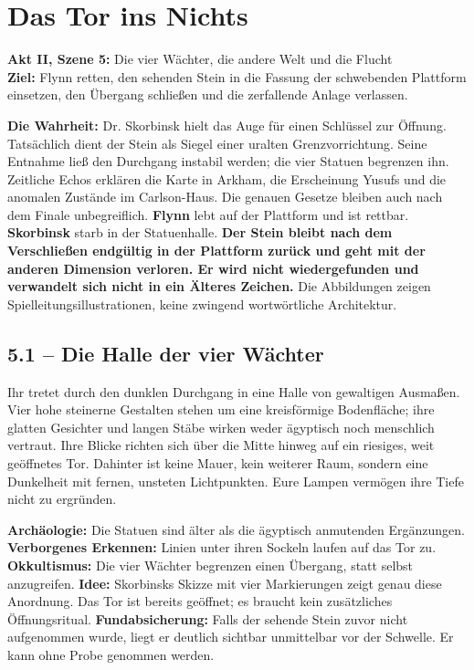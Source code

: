 \chapter{Das Tor ins Nichts}
\noindent\textbf{Akt II, Szene 5:} Die vier Wächter, die andere Welt und die Flucht\\
\textbf{Ziel:} Flynn retten, den sehenden Stein in die Fassung der schwebenden Plattform einsetzen, den Übergang schlie\ss{}en und die zerfallende Anlage verlassen.

\begin{meisterinfo}
\textbf{Die Wahrheit:} Dr. Skorbinsk hielt das Auge für einen Schlüssel zur Öffnung. Tatsächlich dient der Stein als Siegel einer uralten Grenzvorrichtung. Seine Entnahme lie\ss{} den Durchgang instabil werden; die vier Statuen begrenzen ihn. Zeitliche Echos erklären die Karte in Arkham, die Erscheinung Yusufs und die anomalen Zustände im Carlson-Haus. Die genauen Gesetze bleiben auch nach dem Finale unbegreiflich. \textbf{Flynn} lebt auf der Plattform und ist rettbar. \textbf{Skorbinsk} starb in der Statuenhalle. \textbf{Der Stein bleibt nach dem Verschlie\ss{}en endgültig in der Plattform zurück und geht mit der anderen Dimension verloren. Er wird nicht wiedergefunden und verwandelt sich nicht in ein Älteres Zeichen.} Die Abbildungen zeigen Spielleitungsillustrationen, keine zwingend wortwörtliche Architektur.
\end{meisterinfo}

\section{5.1 -- Die Halle der vier Wächter}
\begin{vorlesetextalle}
Ihr tretet durch den dunklen Durchgang in eine Halle von gewaltigen Ausma\ss{}en. Vier hohe steinerne Gestalten stehen um eine kreisförmige Bodenfläche; ihre glatten Gesichter und langen Stäbe wirken weder ägyptisch noch menschlich vertraut. Ihre Blicke richten sich über die Mitte hinweg auf ein riesiges, weit geöffnetes Tor. Dahinter ist keine Mauer, kein weiterer Raum, sondern eine Dunkelheit mit fernen, unsteten Lichtpunkten. Eure Lampen vermögen ihre Tiefe nicht zu ergründen.
\end{vorlesetextalle}
\begin{meisterinfo}
\textbf{Archäologie:} Die Statuen sind älter als die ägyptisch anmutenden Ergänzungen. \textbf{Verborgenes Erkennen:} Linien unter ihren Sockeln laufen auf das Tor zu. \textbf{Okkultismus:} Die vier Wächter begrenzen einen Übergang, statt selbst anzugreifen. \textbf{Idee:} Skorbinsks Skizze mit vier Markierungen zeigt genau diese Anordnung. Das Tor ist bereits geöffnet; es braucht kein zusätzliches Öffnungsritual. \textbf{Fundabsicherung:} Falls der sehende Stein zuvor nicht aufgenommen wurde, liegt er deutlich sichtbar unmittelbar vor der Schwelle. Er kann ohne Probe genommen werden.
\end{meisterinfo}

